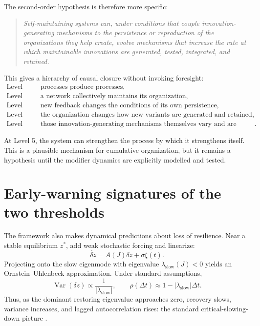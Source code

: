 \documentclass[11pt]{article}
\begin{document}
The second-order hypothesis is therefore more specific:

\begin{quote}
\emph{Self-maintaining systems can, under conditions that couple innovation-generating mechanisms to the persistence or reproduction of the organizations they help create, evolve mechanisms that increase the rate at which maintainable innovations are generated, tested, integrated, and retained.}
\end{quote}

This gives a hierarchy of causal closure without invoking foresight:
\begin{align*}
\text{Level 1:}&\quad \text{processes produce processes},\\
\text{Level 2:}&\quad \text{a network collectively maintains its organization},\\
\text{Level 3:}&\quad \text{new feedback changes the conditions of its own persistence},\\
\text{Level 4:}&\quad \text{the organization changes how new variants are generated and retained},\\
\text{Level 5:}&\quad \text{those innovation-generating mechanisms themselves vary and are retained differentially}.
\end{align*}

At Level 5, the system can strengthen the process by which it strengthens itself. This is a plausible mechanism for cumulative organization, but it remains a hypothesis until the modifier dynamics are explicitly modelled and tested.

\section{Early-warning signatures of the two thresholds}

The framework also makes dynamical predictions about loss of resilience. Near a stable equilibrium $z^*$, add weak stochastic forcing and linearize:
\[
\dot{\delta z}=A(J)\delta z+\sigma\xi(t).
\]
Projecting onto the slow eigenmode with eigenvalue $\lambda_{\mathrm{slow}}(J)<0$ yields an Ornstein--Uhlenbeck approximation. Under standard assumptions,
\[
\operatorname{Var}(\delta z)\propto\frac{1}{|\lambda_{\mathrm{slow}}|},
\qquad
\rho(\Delta t)\approx 1-|\lambda_{\mathrm{slow}}|\Delta t.
\]
Thus, as the dominant restoring eigenvalue approaches zero, recovery slows, variance increases, and lagged autocorrelation rises: the standard critical-slowing-down picture \citep{scheffer2009,dakos2012}.
\end{document}
